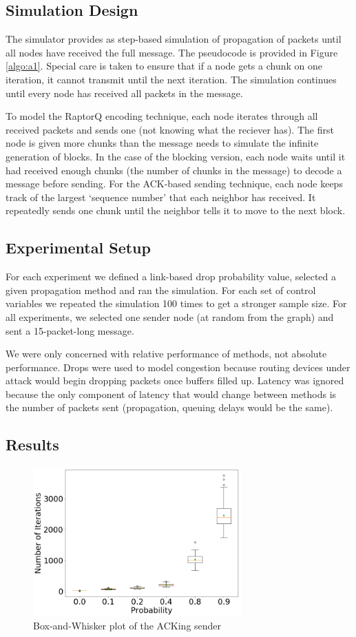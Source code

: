 \subsection{Simulation Design}
The simulator provides as step-based simulation of propagation of packets until all nodes have received the full message. The pseudocode is provided in Figure \ref{algo:a1}. 
Special care is taken to ensure that if a node gets a chunk on one iteration, it cannot transmit until the next iteration. The simulation continues until every node has received all packets in the message.  

To model the RaptorQ encoding technique, each node iterates through all received packets and sends one (not knowing what the reciever has). The first node is given more chunks than the message needs to simulate the infinite generation of blocks. In the case of the blocking version, each node waits until it had received enough chunks (the number of chunks in the message) to decode a message before sending. For the ACK-based sending technique, each node keeps track of the largest `sequence number' that each neighbor has received. It repeatedly sends one chunk until the neighbor tells it to move to the next block.

\subsection{Experimental Setup}
For each experiment we defined a link-based drop probability value, selected a given propagation method and ran the simulation. For each set of control variables we repeated the simulation 100 times to get a stronger sample size. For all experiments, we selected one sender node (at random from the graph) and sent a 15-packet-long message.

We were only concerned with relative performance of methods, not absolute performance. Drops were used to model congestion because routing devices under attack would begin dropping packets once buffers filled up. Latency was ignored because the only component of latency that would change between methods is the number of packets sent (propagation, queuing delays would be the same).

\subsection{Results}

\begin{figure}[tp]
\centering
\noindent
\includegraphics[width=8cm]{figures/ACK_FINAL.png}
\caption{Box-and-Whisker plot of the ACKing sender }
\label{graph:ack}
\end{figure}

